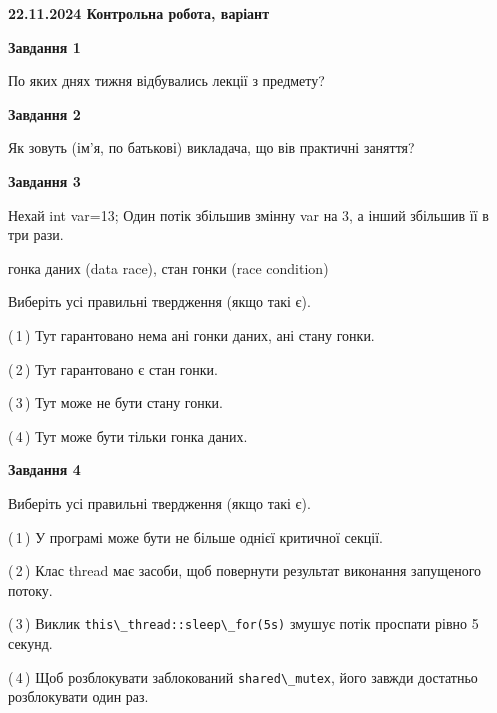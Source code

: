 \documentclass[12pt, ukrainian]{article}
\def\code#1{\Verb!#1!}
\begin{document}
\begin {large}

\textbf{22.11.2024 Контрольна робота, варіант  }\par


{

\begin{center}
\textbf{Завдання 1}
\end{center}

По яких днях тижня відбувались лекції з предмету?


\begin{center}
\textbf{Завдання 2}
\end{center}

Як зовуть (ім'я, по батькові) викладача, що вів практичні заняття?


\begin{center}
\textbf{Завдання 3}
\end{center}

Нехай int var=13; Один потік збільшив змінну var на 3, а інший збільшив її в три рази.

гонка даних (data race), стан гонки (race condition)

Виберіть усі правильні твердження (якщо такі є).\par
\vspace{2mm}
(\,1\,) Тут гарантовано нема ані гонки даних, ані стану гонки.%

(\,2\,) Тут гарантовано є стан гонки.%

(\,3\,) Тут може не бути стану гонки.%

(\,4\,) Тут може бути тільки гонка даних.%


\begin{center}
\textbf{Завдання 4}
\end{center}

Виберіть усі правильні твердження (якщо такі є).\par
\vspace{2mm}

(\,1\,) У програмі може бути не більше однієї критичної секції.%

(\,2\,) Клас thread має засоби, щоб повернути результат виконання запущеного потоку.%

(\,3\,) Виклик \code{this\_thread::sleep\_for(5s)} змушує потік проспати рівно 5 секунд.%

(\,4\,) Щоб розблокувати заблокований \code{shared\_mutex}, його завжди достатньо розблокувати один раз.%


}
\end{large}
\end{document}
